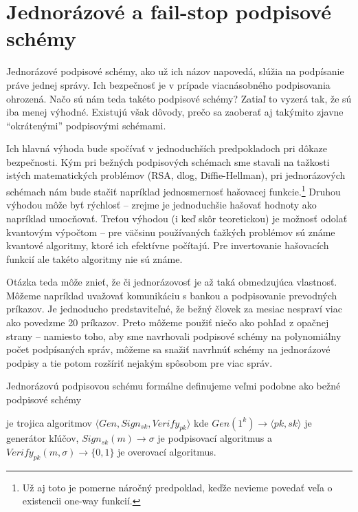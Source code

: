 \section{Jednorázové a fail-stop podpisové schémy}

Jednorázové podpisové schémy, ako už ich názov napovedá, slúžia na
podpísanie práve jednej správy. Ich bezpečnosť je v prípade viacnásobného
podpisovania ohrozená. Načo sú nám teda takéto podpisové schémy? Zatiaľ to
vyzerá tak, že sú iba menej výhodné. Existujú však dôvody, prečo sa zaoberať
aj takýmito zjavne ``okrátenými'' podpisovými schémami.

Ich hlavná výhoda bude spočívať v jednoduchších predpokladoch pri dôkaze
bezpečnosti. Kým pri bežných podpisových schémach sme stavali na
tažkosti istých matematických problémov (RSA, dlog, Diffie-Hellman),
pri jednorázových schémach nám bude stačiť napríklad jednosmernosť
hašovacej funkcie.\footnote{Už aj toto je pomerne náročný predpoklad,
    keďže nevieme povedať veľa o existencii one-way funkcií.}
Druhou výhodou môže byť rýchlosť -- zrejme je jednoduchšie hašovať hodnoty
ako napríklad umocňovať.
Treťou výhodou (i keď skôr teoretickou) je možnosť odolať kvantovým
výpočtom -- pre väčsinu používaných ťažkých problémov sú známe kvantové
algoritmy, ktoré ich efektívne počítajú. Pre invertovanie hašovacích
funkcií ale takéto algoritmy nie sú známe.

Otázka teda môže znieť, že či jednorázovosť je až taká obmedzujúca
vlastnosť. Môžeme napríklad uvažovať komunikáciu s bankou a podpisovanie
prevodných príkazov. Je jednoducho predstaviteľné, že
bežný človek za mesiac nespraví viac ako povedzme 20 príkazov.
Preto môžeme použiť
niečo ako pohľad z opačnej strany -- namiesto toho, aby sme navrhovali
podpisové schémy na polynomiálny počet podpísaných správ,
môžeme sa snažiť navrhnúť schémy na jednorázové podpisy a tie potom
rozšíriť nejakým spôsobom pre viac správ.

Jednorázovú podpisovou schému formálne definujeme veľmi podobne ako bežné
podpisové schémy

\begin{definicia}
    je trojica algoritmov 
    $\langle Gen, Sign_{sk}, Verify_{pk} \rangle$ kde
    $Gen(1^k) \rightarrow \langle pk, sk \rangle$ je generátor kľúčov,
    $Sign_{sk}(m) \rightarrow \sigma$ je podpisovací algoritmus a
    $Verify_{pk}(m,\sigma) \rightarrow \{0,1\}$ je overovací algoritmus.
\end{definicia}

